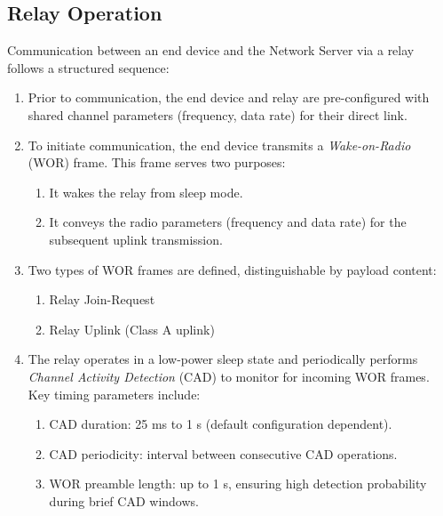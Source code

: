 \subsection{Relay Operation}

Communication between an end device and the Network Server via a relay follows a structured sequence:

\begin{enumerate}
    \item Prior to communication, the end device and relay are pre-configured with shared channel parameters (frequency, data rate) for their direct link.

    \item To initiate communication, the end device transmits a \emph{Wake-on-Radio} (WOR) frame. This frame serves two purposes:
          \begin{enumerate}
              \item It wakes the relay from sleep mode.
              \item It conveys the radio parameters (frequency and data rate) for the subsequent uplink transmission.
          \end{enumerate}

    \item Two types of WOR frames are defined, distinguishable by payload content:
          \begin{enumerate}
              \item Relay Join-Request
              \item Relay Uplink (Class A uplink)
          \end{enumerate}

    \item The relay operates in a low-power sleep state and periodically performs \emph{Channel Activity Detection} (CAD) to monitor for incoming WOR frames. Key timing parameters include:
          \begin{enumerate}
              \item CAD duration: 25 ms to 1 s (default configuration dependent).
              \item CAD periodicity: interval between consecutive CAD operations.
              \item WOR preamble length: up to 1 s, ensuring high detection probability during brief CAD windows.
          \end{enumerate}


\end{enumerate}
